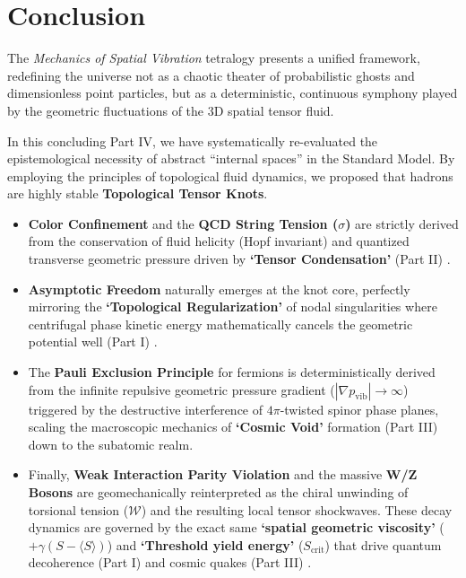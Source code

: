 \documentclass[reprint,amsmath,amssymb,aps,prd]{revtex4-2}
\begin{document}
\section{Conclusion}

The \textit{Mechanics of Spatial Vibration} tetralogy presents a unified framework, redefining the universe not as a chaotic theater of probabilistic ghosts and dimensionless point particles, but as a deterministic, continuous symphony played by the geometric fluctuations of the 3D spatial tensor fluid.

In this concluding Part IV, we have systematically re-evaluated the epistemological necessity of abstract ``internal spaces'' in the Standard Model. By employing the principles of topological fluid dynamics, we proposed that hadrons are highly stable \textbf{Topological Tensor Knots}.

\begin{itemize}
    \item \textbf{Color Confinement} and the \textbf{QCD String Tension ($\sigma$)} are strictly derived from the conservation of fluid helicity (Hopf invariant) \cite{Moffatt1969} and quantized transverse geometric pressure driven by \textbf{`Tensor Condensation'} (Part II) \cite{YooPart2}.
    \item \textbf{Asymptotic Freedom} naturally emerges at the knot core, perfectly mirroring the \textbf{`Topological Regularization'} of nodal singularities where centrifugal phase kinetic energy mathematically cancels the geometric potential well (Part I) \cite{YooPart1, Gross1973}.
    \item The \textbf{Pauli Exclusion Principle} \cite{Pauli1925} for fermions is deterministically derived from the infinite repulsive geometric pressure gradient ($|\nabla p_{\mathrm{vib}}| \to \infty$) triggered by the destructive interference of $4\pi$-twisted spinor phase planes, scaling the macroscopic mechanics of \textbf{`Cosmic Void'} formation (Part III) \cite{YooPart3} down to the subatomic realm.
    \item Finally, \textbf{Weak Interaction Parity Violation} \cite{Wu1957} and the massive \textbf{W/Z Bosons} are geomechanically reinterpreted as the chiral unwinding of torsional tension ($\mathcal{W}$) and the resulting local tensor shockwaves. These decay dynamics are governed by the exact same \textbf{`spatial geometric viscosity'} ($+\gamma(S - \langle S \rangle)$) and \textbf{`Threshold yield energy'} ($S_{\mathrm{crit}}$) that drive quantum decoherence (Part I) \cite{YooPart1} and cosmic quakes (Part III) \cite{YooPart3}.
\end{itemize}
\end{document}

